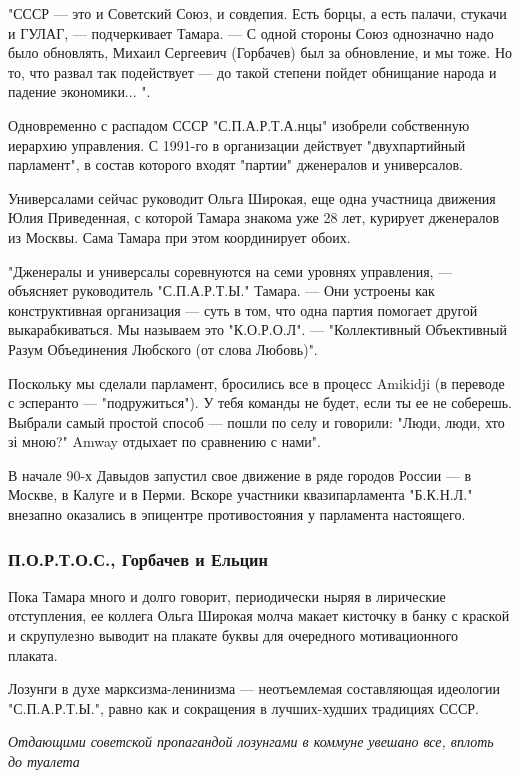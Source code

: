 \documentclass[a4paper,11pt]{extreport}
\begin{document}
"СССР --- это и Советский Союз, и совдепия. Есть борцы, а есть палачи, стукачи и
ГУЛАГ, --- подчеркивает Тамара. --- С одной стороны Союз однозначно надо было
обновлять, Михаил Сергеевич (Горбачев) был за обновление, и мы тоже. Но то, что
развал так подействует --- до такой степени пойдет обнищание народа и падение
экономики... ".

Одновременно с распадом СССР "С.П.А.Р.Т.А.нцы" изобрели собственную иерархию
управления. С 1991-го в организации действует "двухпартийный парламент", в
состав которого входят "партии" дженералов и универсалов. 

Универсалами сейчас руководит Ольга Широкая, еще одна участница движения Юлия
Приведенная, с которой Тамара знакома уже 28 лет, курирует дженералов из
Москвы. Сама Тамара при этом координирует обоих.

"Дженералы и универсалы соревнуются на семи уровнях управления, --- объясняет
руководитель "С.П.А.Р.Т.Ы." Тамара. --- Они устроены как конструктивная
организация --- суть в том, что одна партия помогает другой выкарабкиваться. Мы
называем это "К.О.Р.О.Л". --- "Коллективный Объективный Разум Объединения
Любского (от слова Любовь)". 

Поскольку мы сделали парламент, бросились все в процесс Amikidji (в переводе с
эсперанто --- "подружиться"). У тебя команды не будет, если ты ее не соберешь.
Выбрали самый простой способ --- пошли по селу и говорили: "Люди, люди, хто зі
мною?" Amway отдыхает по сравнению с нами".

В начале 90-х Давыдов запустил свое движение в ряде городов России --- в Москве,
в Калуге и в Перми. Вскоре участники квазипарламента "Б.К.Н.Л." внезапно
оказались в эпицентре противостояния у парламента настоящего.

\subsubsection{П.О.Р.Т.О.С., Горбачев и Ельцин}

Пока Тамара много и долго говорит, периодически ныряя в лирические отступления,
ее коллега Ольга Широкая молча макает кисточку в банку с краской и скрупулезно
выводит на плакате буквы для очередного мотивационного плаката. 

Лозунги в духе марксизма-ленинизма --- неотъемлемая составляющая идеологии
"С.П.А.Р.Т.Ы.", равно как и сокращения в лучших-худших традициях СССР.

\emph{Отдающими советской пропагандой лозунгами в коммуне увешано все, вплоть до туалета}
\end{document}
